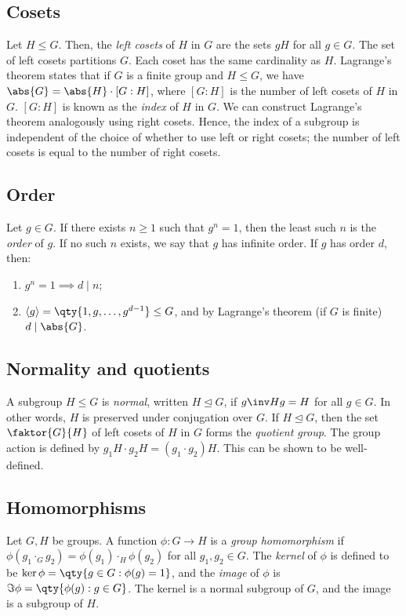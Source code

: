 \subsection{Cosets}
Let $H \leq G$.
Then, the \textit{left cosets} of $H$ in $G$ are the sets $gH$ for all $g \in G$.
The set of left cosets partitions $G$.
Each coset has the same cardinality as $H$.
Lagrange's theorem states that if $G$ is a finite group and $H \leq G$, we have $\abs{G} = \abs{H} \cdot [G : H]$, where $[G : H]$ is the number of left cosets of $H$ in $G$.
$[G : H]$ is known as the \textit{index} of $H$ in $G$.
We can construct Lagrange's theorem analogously using right cosets.
Hence, the index of a subgroup is independent of the choice of whether to use left or right cosets; the number of left cosets is equal to the number of right cosets.

\subsection{Order}
Let $g \in G$.
If there exists $n \geq 1$ such that $g^n = 1$, then the least such $n$ is the \textit{order} of $g$.
If no such $n$ exists, we say that $g$ has infinite order.
If $g$ has order $d$, then:
\begin{enumerate}
	\item $g^n = 1 \implies d \mid n$;
	\item $\genset{g} = \qty{1, g, \dots, g^{d-1}} \leq G$, and by Lagrange's theorem (if $G$ is finite) $d \mid \abs{G}$.
\end{enumerate}

\subsection{Normality and quotients}
A subgroup $H \leq G$ is \textit{normal}, written $H \trianglelefteq G$, if $g\inv H g = H$ for all $g \in G$.
In other words, $H$ is preserved under conjugation over $G$.
If $H \trianglelefteq G$, then the set $\faktor{G}{H}$ of left cosets of $H$ in $G$ forms the \textit{quotient group}.
The group action is defined by $g_1 H \cdot g_2 H = (g_1 \cdot g_2) H$.
This can be shown to be well-defined.

\subsection{Homomorphisms}
Let $G, H$ be groups.
A function $\phi : G \to H$ is a \textit{group homomorphism} if $\phi(g_1 \cdot_G g_2) = \phi(g_1) \cdot_H \phi(g_2)$ for all $g_1, g_2 \in G$.
The \textit{kernel} of $\phi$ is defined to be $\ker \phi = \qty{g \in G : \phi(g) = 1}$, and the \textit{image} of $\phi$ is $\Im \phi = \qty{\phi(g) : g \in G}$.
The kernel is a normal subgroup of $G$, and the image is a subgroup of $H$.

